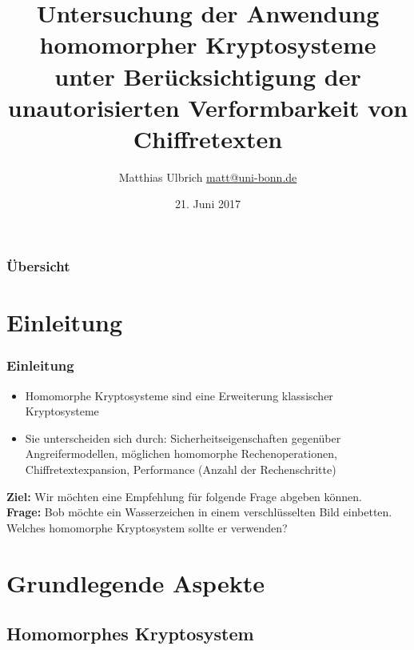 \documentclass[handout,usenames,dvipsnames]{beamer}
\begin{document}
\title{Untersuchung der Anwendung homomorpher Kryptosysteme unter Berücksichtigung der unautorisierten Verformbarkeit von Chiffretexten}  
\author{\texorpdfstring{
		Matthias Ulbrich\newline
		 \url{matt@uni-bonn.de}}{Matthias Ulbrich}}

\date{21. Juni 2017} 



	
\begin{frame}
\titlepage
\end{frame} 
	
\begin{frame}
\frametitle{Übersicht}
\tableofcontents
\end{frame} 
	
\section{Einleitung} 

\begin{frame}
\frametitle{Einleitung} 
\begin{itemize}
	\item 	Homomorphe Kryptosysteme sind eine Erweiterung klassischer Kryptosysteme
	\item	Sie unterscheiden sich durch: Sicherheitseigenschaften gegenüber Angreifermodellen, möglichen homomorphe Rechenoperationen, Chiffretextexpansion, Performance (Anzahl der Rechenschritte)
\end{itemize}
\textbf{Ziel:} Wir möchten eine Empfehlung für folgende Frage abgeben können.\\
\textbf{Frage:} Bob möchte ein Wasserzeichen in einem verschlüsselten Bild einbetten. Welches homomorphe Kryptosystem sollte er verwenden?
\end{frame}

\section{Grundlegende Aspekte}
\subsection{Homomorphes Kryptosystem}
\end{document}
